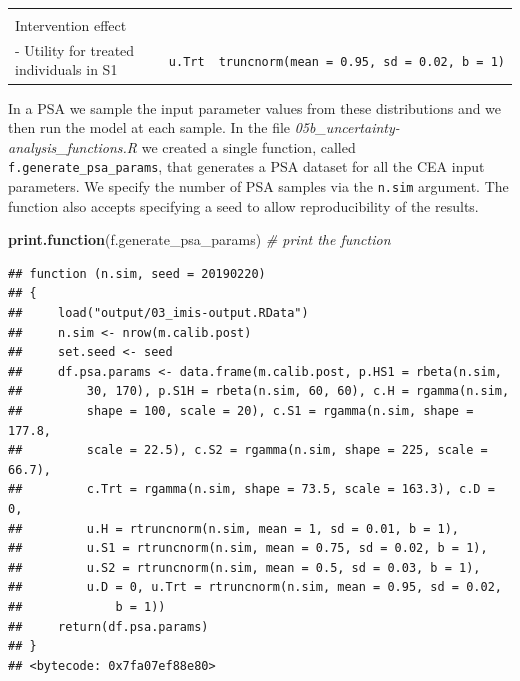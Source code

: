 \documentclass[]{article}
\newenvironment{Shaded}{\begin{snugshade}}{\end{snugshade}}
\newcommand{\KeywordTok}[1]{\textcolor[rgb]{0.13,0.29,0.53}{\textbf{#1}}}
\newcommand{\CommentTok}[1]{\textcolor[rgb]{0.56,0.35,0.01}{\textit{#1}}}
\newcommand{\NormalTok}[1]{#1}
\begin{document}
\begin{longtable}[]{@{}lcc@{}}
\begin{minipage}[t]{0.20\columnwidth}
\end{minipage}\tabularnewline
\begin{minipage}[t]{0.43\columnwidth}\raggedright\strut
Intervention effect\strut
\end{minipage} & \begin{minipage}[t]{0.18\columnwidth}\centering\strut
\strut
\end{minipage} & \begin{minipage}[t]{0.20\columnwidth}\centering\strut
\strut
\end{minipage}\tabularnewline
\begin{minipage}[t]{0.43\columnwidth}\raggedright\strut
- Utility for treated individuals in S1\strut
\end{minipage} & \begin{minipage}[t]{0.18\columnwidth}\centering\strut
\texttt{u.Trt}\strut
\end{minipage} & \begin{minipage}[t]{0.20\columnwidth}\centering\strut
\texttt{truncnorm(mean\ =\ 0.95,\ sd\ =\ 0.02,\ b\ =\ 1)}\strut
\end{minipage}\tabularnewline
\bottomrule
\end{longtable}

In a PSA we sample the input parameter values from these distributions
and we then run the model at each sample. In the file
\emph{05b\_uncertainty-analysis\_functions.R} we created a single
function, called \texttt{f.generate\_psa\_params}, that generates a PSA
dataset for all the CEA input parameters. We specify the number of PSA
samples via the \texttt{n.sim} argument. The function also accepts
specifying a seed to allow reproducibility of the results.

\begin{Shaded}
\begin{Highlighting}[]
\KeywordTok{print.function}\NormalTok{(f.generate_psa_params) }\CommentTok{# print the function }
\end{Highlighting}
\end{Shaded}

\begin{verbatim}
## function (n.sim, seed = 20190220) 
## {
##     load("output/03_imis-output.RData")
##     n.sim <- nrow(m.calib.post)
##     set.seed <- seed
##     df.psa.params <- data.frame(m.calib.post, p.HS1 = rbeta(n.sim, 
##         30, 170), p.S1H = rbeta(n.sim, 60, 60), c.H = rgamma(n.sim, 
##         shape = 100, scale = 20), c.S1 = rgamma(n.sim, shape = 177.8, 
##         scale = 22.5), c.S2 = rgamma(n.sim, shape = 225, scale = 66.7), 
##         c.Trt = rgamma(n.sim, shape = 73.5, scale = 163.3), c.D = 0, 
##         u.H = rtruncnorm(n.sim, mean = 1, sd = 0.01, b = 1), 
##         u.S1 = rtruncnorm(n.sim, mean = 0.75, sd = 0.02, b = 1), 
##         u.S2 = rtruncnorm(n.sim, mean = 0.5, sd = 0.03, b = 1), 
##         u.D = 0, u.Trt = rtruncnorm(n.sim, mean = 0.95, sd = 0.02, 
##             b = 1))
##     return(df.psa.params)
## }
## <bytecode: 0x7fa07ef88e80>
\end{verbatim}
\end{document}
